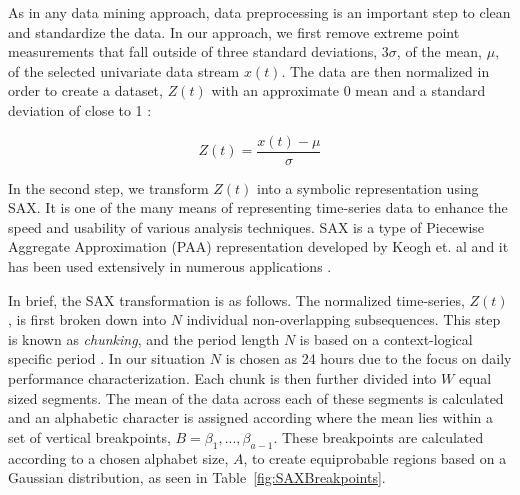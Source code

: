 As in any data mining approach, data preprocessing is an important step to clean and standardize the data. In our approach, we first remove extreme point measurements that fall outside of three standard deviations, 3$\sigma$, of the mean, $\mu$, of the selected univariate data stream $x(t)$. The data are then normalized in order to create a dataset, $Z(t)$ with an approximate 0 mean and a standard deviation of close to 1 \cite{goldin_similiarity_1995}:

\begin{equation}
Z(t)=\frac{x(t) -\mu}{\sigma}
\end{equation}

In the second step, we transform $Z(t)$ into a symbolic representation using SAX. It is one of the many means of representing time-series data to enhance the speed and usability of various analysis techniques. SAX is a type of Piecewise Aggregate Approximation (PAA) representation developed by Keogh et. al and it has been used extensively in numerous applications \cite{Lin:2007wb}. 

In brief, the SAX transformation is as follows. The normalized time-series, $Z(t)$, is first broken down into $N$ individual non-overlapping subsequences. This step is known as \emph{chunking}, and the period length $N$ is based on a context-logical specific period \cite{Lin:2005bi}. In our situation $N$ is chosen as 24 hours due to the focus on daily performance characterization.  Each chunk is then further divided into $W$ equal sized segments. The mean of the data across each of these segments is calculated and an alphabetic character is assigned according where the mean lies within a set of vertical breakpoints, $B=\beta_1,...,\beta_{a-1}$. These breakpoints are calculated according to a chosen alphabet size, $A$, to create equiprobable regions based on a Gaussian distribution, as seen in Table~\ref{fig:SAXBreakpoints}.